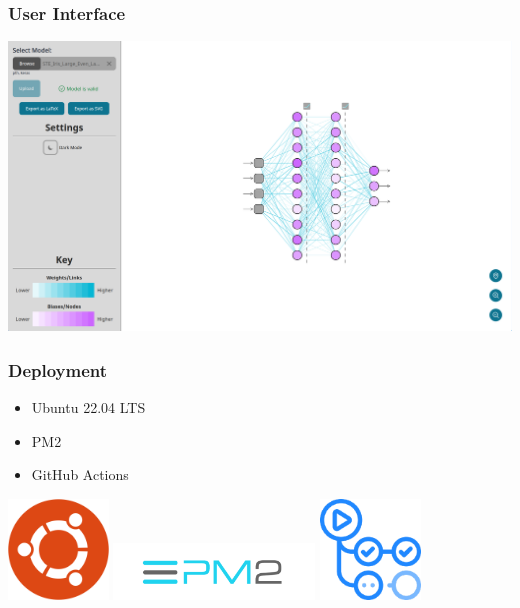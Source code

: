 \documentclass{beamer}
\begin{document}
\begin{frame}
    \frametitle{User Interface}
    \centering
    \includegraphics[scale=0.15]{../03_design/res/final_interface.png}
\end{frame}

\begin{frame}
    \frametitle{Deployment}
    \begin{block}{}
        \begin{itemize}
            \item Ubuntu 22.04 LTS
            \item PM2
            \item GitHub Actions
        \end{itemize}
    \end{block}
    \vspace{0.75cm}
    \centering
    \includegraphics[scale=0.2, width=0.2\textwidth]{res/ubuntu_logo.png} \hfill
    \includegraphics[width=0.4\textwidth]{res/pm2_logo.png} \hfill
    \includegraphics[width=0.2\textwidth]{res/github_actions_logo.png} \hfill
\end{frame}
\end{document}
